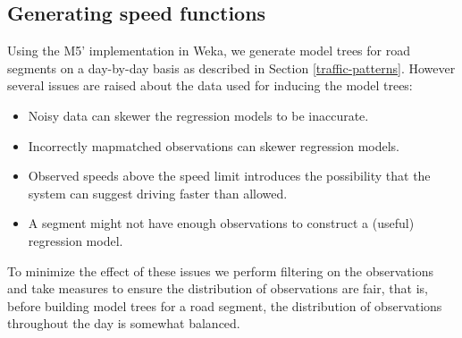 \subsection{Generating speed functions}\label{sec:speedfunctiongen}
Using the M5' implementation in Weka, we generate model trees for road segments on a day-by-day basis as described in Section \ref{traffic-patterns}. However several issues are raised about the data used for inducing the model trees:
\begin{itemize}
\item Noisy data can skewer the regression models to be inaccurate.
\item Incorrectly mapmatched observations can skewer regression models.
\item Observed speeds above the speed limit introduces the possibility that the system can suggest driving faster than allowed.
\item A segment might not have enough observations to construct a (useful) regression model.
\end{itemize}
To minimize the effect of these issues we perform filtering on the observations and take measures to ensure the distribution of observations are fair, that is, before building model trees for a road segment, the distribution of observations throughout the day is somewhat balanced.
